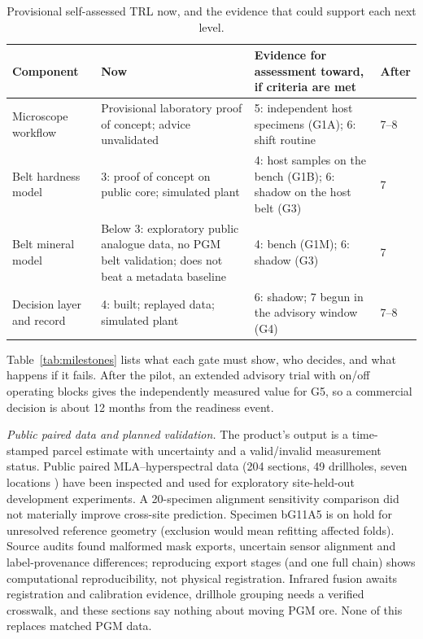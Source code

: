 \documentclass[10pt,a4paper,twocolumn]{article}
\begin{document}
\begin{table}[t]
\centering\footnotesize
\caption{Provisional self-assessed TRL now, and the evidence that could support each next level.}
\label{tab:trl}
\begin{tabularx}{\columnwidth}{@{}L{1.35cm}L{1.75cm}YL{1.0cm}@{}}
\toprule
Component & Now & Evidence for assessment toward, if criteria are met & After \\
\midrule
Microscope workflow & Provisional laboratory proof of concept; advice unvalidated & 5: independent host specimens (G1A); 6: shift routine & 7--8 \\
Belt hardness model & 3: proof of concept on public core; simulated plant & 4: host samples on the bench (G1B); 6: shadow on the host belt (G3) & 7 \\
Belt mineral model & Below 3: exploratory public analogue data, no PGM belt validation; does not beat a metadata baseline & 4: bench (G1M); 6: shadow (G3) & 7 \\
Decision layer and record & 4: built; replayed data; simulated plant & 6: shadow; 7 begun in the advisory window (G4) & 7--8 \\
\bottomrule
\end{tabularx}
\end{table}

Table~\ref{tab:milestones} lists what each gate must show, who decides, and what happens if it fails. After the pilot, an extended advisory trial with on/off operating blocks gives the independently measured value for G5, so a commercial decision is about 12 months from the readiness event.

\emph{Public paired data and planned validation.} The product's output is a time-stamped parcel estimate with uncertainty and a valid/invalid measurement status. Public paired MLA--hyperspectral data (204 sections, 49 drillholes, seven locations \cite{rodare}) have been inspected and used for exploratory site-held-out development experiments. A 20-specimen alignment sensitivity comparison did not materially improve cross-site prediction. Specimen bG11A5 is on hold for unresolved reference geometry (exclusion would mean refitting affected folds). Source audits found malformed mask exports, uncertain sensor alignment and label-provenance differences; reproducing export stages (and one full chain) shows computational reproducibility, not physical registration. Infrared fusion awaits registration and calibration evidence, drillhole grouping needs a verified crosswalk, and these sections say nothing about moving PGM ore. None of this replaces matched PGM data.
\end{document}
